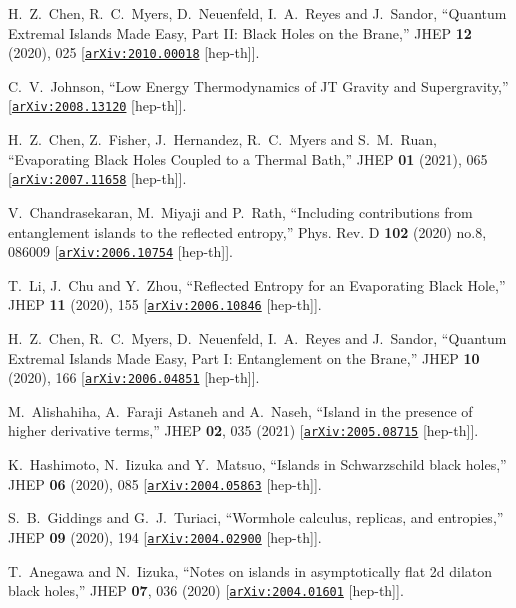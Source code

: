 \documentclass[12pt]{article}
\newcommand \arXiv [1]{\href{http://arxiv.org/abs/#1}{\tt arXiv:#1}}
\begin{document}
\begin{thebibliography}{99}
{%
H.~Z.~Chen, R.~C.~Myers, D.~Neuenfeld, I.~A.~Reyes and J.~Sandor,
``Quantum Extremal Islands Made Easy, Part II: Black Holes on the Brane,''
JHEP \textbf{12} (2020), 025
[\arXiv{2010.00018} [hep-th]].

C.~V.~Johnson,
``Low Energy Thermodynamics of JT Gravity and Supergravity,''
[\arXiv{2008.13120} [hep-th]].

H.~Z.~Chen, Z.~Fisher, J.~Hernandez, R.~C.~Myers and S.~M.~Ruan,
``Evaporating Black Holes Coupled to a Thermal Bath,''
JHEP \textbf{01} (2021), 065
[\arXiv{2007.11658} [hep-th]].

V.~Chandrasekaran, M.~Miyaji and P.~Rath,
``Including contributions from entanglement islands to the reflected entropy,''
Phys. Rev. D \textbf{102} (2020) no.8, 086009
[\arXiv{2006.10754} [hep-th]].

T.~Li, J.~Chu and Y.~Zhou,
``Reflected Entropy for an Evaporating Black Hole,''
JHEP \textbf{11} (2020), 155
[\arXiv{2006.10846} [hep-th]].

H.~Z.~Chen, R.~C.~Myers, D.~Neuenfeld, I.~A.~Reyes and J.~Sandor,
``Quantum Extremal Islands Made Easy, Part I: Entanglement on the Brane,''
JHEP \textbf{10} (2020), 166
[\arXiv{2006.04851} [hep-th]].

M.~Alishahiha, A.~Faraji Astaneh and A.~Naseh,
``Island in the presence of higher derivative terms,''
JHEP \textbf{02}, 035 (2021)
[\arXiv{2005.08715} [hep-th]].

K.~Hashimoto, N.~Iizuka and Y.~Matsuo,
``Islands in Schwarzschild black holes,''
JHEP \textbf{06} (2020), 085
[\arXiv{2004.05863} [hep-th]].

S.~B.~Giddings and G.~J.~Turiaci,
``Wormhole calculus, replicas, and entropies,''
JHEP \textbf{09} (2020), 194
[\arXiv{2004.02900} [hep-th]].

T.~Anegawa and N.~Iizuka,
``Notes on islands in asymptotically flat 2d dilaton black holes,''
JHEP \textbf{07}, 036 (2020)
[\arXiv{2004.01601} [hep-th]].

}
\end{thebibliography}
\end{document}
